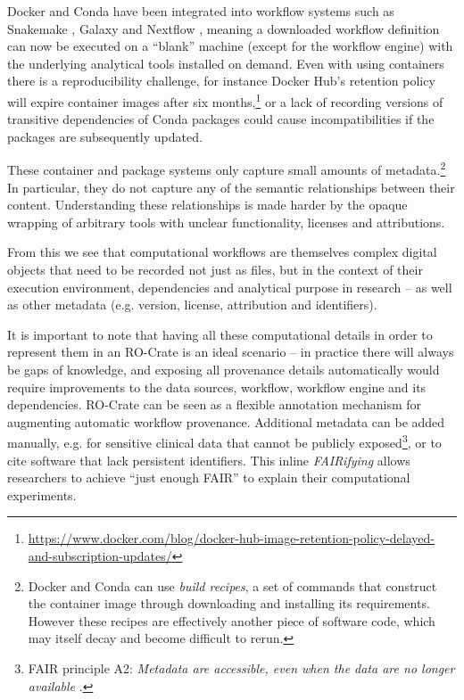 \documentclass[ds,v1.1.2,openaccess]{iosart2x}%
\begin{document}
Docker and Conda have been integrated into workflow systems such as
Snakemake \cite{doi:10.1093/bioinformatics/bts480}, Galaxy
\cite{doi:10.1093/nar/gky379} and Nextflow \cite{doi:10.1038/nbt.3820}, meaning
a downloaded workflow definition can now be executed on a ``blank''
machine (except for the workflow engine) with the underlying analytical
tools installed on demand. Even with using containers there is a
reproducibility challenge, for instance Docker Hub's retention policy
will expire container images after six
months,\footnote{\url{https://www.docker.com/blog/docker-hub-image-retention-policy-delayed-and-subscription-updates/}}
or a lack of recording versions of transitive dependencies of Conda
packages could cause incompatibilities if the packages are subsequently updated.

These container and package systems only capture small amounts of
metadata.\footnote{Docker and Conda can use \textit{build recipes}, a set of commands
that construct the container image through downloading and installing
its requirements. However these recipes are effectively another piece
of software code, which may itself decay and become difficult to rerun.} In particular, they do not capture any of the semantic
relationships between their content. Understanding these relationships
is made harder by the opaque wrapping of arbitrary tools with unclear
functionality, licenses and attributions.

From this we see that computational workflows are themselves complex
digital objects that need to be recorded not just as files, but in the
context of their execution environment, dependencies and analytical
purpose in research -- as well as other metadata (e.g. version,
license, attribution and identifiers).

It is important to note that having all these computational details in
order to represent them in an RO-Crate is an ideal scenario -- in
practice there will always be gaps of knowledge, and exposing all
provenance details automatically would require improvements to the data
sources, workflow, workflow engine and its dependencies. RO-Crate can
be seen as a flexible annotation mechanism for augmenting automatic
workflow provenance. Additional metadata can be added manually, e.g.
for sensitive clinical data that cannot be publicly exposed\footnote{FAIR principle A2: \textit{Metadata are accessible, even when the
data are no longer available} \cite{doi:10.1038/sdata.2016.18}.}, or
to cite software that lack persistent identifiers. This inline
\textit{FAIRifying} allows researchers to achieve ``just enough FAIR'' to
explain their computational experiments.
\end{document}
